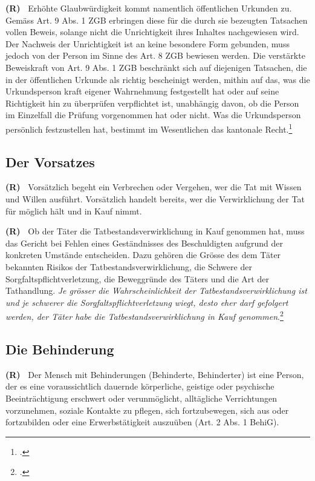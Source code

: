 \documentclass[paper=a4,fontsize=12pt, oneside, numbers=noenddot]{scrbook}
\newcounter{rz}
\newcommand{\Rz}{
	\addtocounter{rz}{1}\textbf{(R\arabic{rz})~}
}
\begin{document}
\Rz Erhöhte Glaubwürdigkeit kommt namentlich öffentlichen Urkunden zu. Gemäss Art. 9 Abs. 1 ZGB erbringen diese für die durch sie bezeugten Tatsachen vollen Beweis, solange nicht die Unrichtigkeit ihres Inhaltes nachgewiesen wird. Der Nachweis der Unrichtigkeit ist an keine besondere Form gebunden, muss jedoch von der Person im Sinne des Art. 8 ZGB bewiesen werden. Die verstärkte Beweiskraft von Art. 9 Abs. 1 ZGB beschränkt sich auf diejenigen Tatsachen, die in der öffentlichen Urkunde als richtig bescheinigt werden, mithin auf das, was die Urkundsperson kraft eigener Wahrnehmung festgestellt hat oder auf seine Richtigkeit hin zu überprüfen verpflichtet ist, unabhängig davon, ob die Person im Einzelfall die Prüfung vorgenommen hat oder nicht. Was die Urkundsperson persönlich festzustellen hat, bestimmt im Wesentlichen das kantonale Recht.\footcite{BGE113IV77}


\subsection{Der Vorsatzes}
\Rz Vorsätzlich begeht ein Verbrechen oder Vergehen, wer die Tat mit Wissen und Willen ausführt. Vorsätzlich handelt bereits, wer die Verwirklichung der Tat für möglich hält und in Kauf nimmt.

\Rz Ob der Täter die Tatbestandsverwirklichung in Kauf genommen hat, muss das Gericht bei Fehlen eines Geständnisses des Beschuldigten aufgrund der konkreten Umstände entscheiden. Dazu gehören die Grösse des dem Täter bekannten Risikos der Tatbestandsverwirklichung, die Schwere der Sorgfaltspflichtverletzung, die Beweggründe des Täters und die Art der Tathandlung. \textit{Je grösser die Wahrscheinlichkeit der Tatbestandsverwirklichung ist und je schwerer die Sorgfaltspflichtverletzung wiegt, desto eher darf gefolgert werden, der Täter habe die Tatbestandsverwirklichung in Kauf genommen}.\footcite[Erw. 2.2.1.1 d) - (Seite 67)]{KGE46018365}

\subsection{Die Behinderung}\label{BehiG}
\Rz Der Mensch mit Behinderungen (Behinderte, Behinderter) ist eine Person, der es eine voraussichtlich dauernde körperliche, geistige oder psychische Beeinträchtigung erschwert oder verunmöglicht, alltägliche Verrichtungen vorzunehmen, soziale Kontakte zu pflegen, sich fortzubewegen, sich aus oder fortzubilden oder eine Erwerbstätigkeit auszuüben (Art. 2 Abs. 1 BehiG). 
\end{document}
